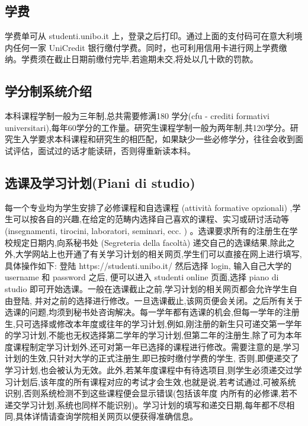 \subsection{学费}
学费单可从 studenti.unibo.it 上，登录之后打印。通过上面的支付码可在意大利境内任何一家 UniCredit 银行缴付学费。同时，也可利用信用卡进行网上学费缴纳。学费须在截止日期前缴付完毕,若逾期未交,将处以几十欧的罚款。 

\subsection{学分制系统介绍}
本科课程学制一般为三年制,总共需要修满180 学分(cfu - crediti formativi universitari),每年60学分的工作量。研究生课程学制一般为两年制,共120学分。研究生入学要求本科课程和研究生的相匹配，如果缺少一些必修学分，往往会收到面试评估，面试过的话才能读研，否则得重新读本科。 

\subsection{选课及学习计划(Piani di studio)}
每一个专业均为学生安排了必修课程和自选课程 (attività formative opzionali) ,学生可以按各自的兴趣,在给定的范畴内选择自己喜欢的课程、实习或研讨活动等(insegnamenti, tirocini, laboratori, seminari, ecc. ) 。选课要求所有的注册生在学校规定日期内,向系秘书处 (Segreteria della facoltà) 递交自己的选课结果,除此之外,大学网站上也开通了有关学习计划的相关网页,学生们可以直接在网上进行填写,具体操作如下: 登陆 https://studenti.unibo.it/ 然后选择 login, 输入自己大学的 username 和 password 之后, 便可以进入 studenti online 页面,选择 piano di studio 即可开始选课。一般在选课截止之前,学习计划的相关网页都会允许学生自由登陆, 并对之前的选择进行修改。一旦选课截止,该网页便会关闭。之后所有关于选课的问题,均须到秘书处咨询解决。每一学年都有选课的机会,但每一学年的注册生,只可选择或修改本年度或往年的学习计划,例如,刚注册的新生只可递交第一学年的学习计划,不能也无权选择第二学年的学习计划,但第二年的注册生,除了可为本年度课程制定学习计划外,还可对第一年已选择的课程进行修改。需要注意的是,学习计划的生效,只针对大学的正式注册生,即已按时缴付学费的学生, 否则,即便递交了学习计划,也会被认为无效。此外,若某年度课程中有待选项目,则学生必须递交过学习计划后,该年度的所有课程对应的考试才会生效,也就是说,若考试通过,可被系统识别,否则系统检测不到这些课程便会显示错误(包括该年度 内所有的必修课,若不递交学习计划,系统也同样不能识别)。学习计划的填写和递交日期,每年都不尽相同,具体详情请查询学院相关网页以便获得准确信息。 

